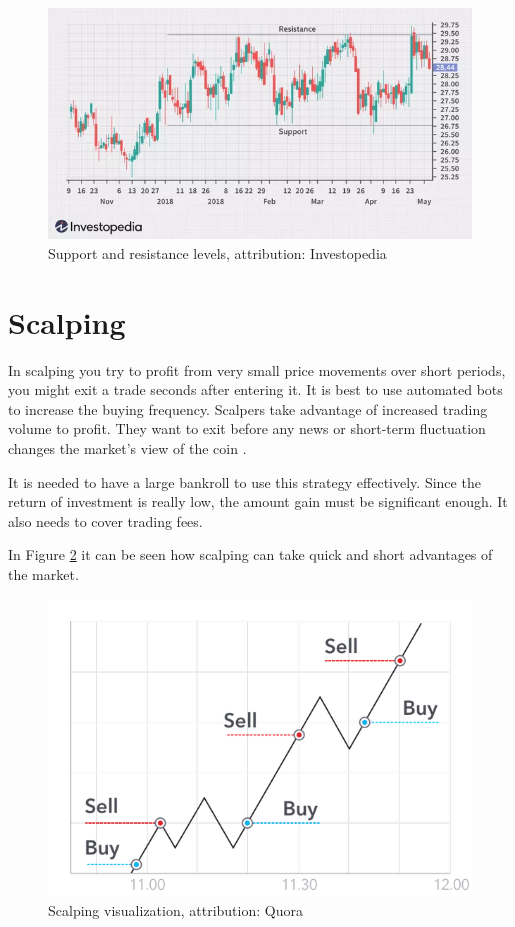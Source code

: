 \begin{figure}[ht]
    \centering
    \includegraphics[width=\columnwidth]{figures/dotdash-final-trading-range.png}
    \caption{Support and resistance levels, attribution: Investopedia \cite{investopedia:trading-range}}
    \label{sup-and-res-levels}
\end{figure}

\section{Scalping}
In scalping you try to profit from very small price movements over short periods, you might exit a trade seconds after entering it. It is best to use automated bots to increase the buying frequency. Scalpers take advantage of increased trading volume to profit. They want to exit before any news or short-term fluctuation changes the market's view of the coin \cite{best-crypto-daytrading}.

It is needed to have a large bankroll to use this strategy effectively. Since the return of investment is really low, the amount gain must be significant enough. It also needs to cover trading fees. 

In Figure \ref{scalping-figure} it can be seen how scalping can take quick and short advantages of the market.

\begin{figure}[ht]
    \label{scalping-figure}
    \centering
    \includegraphics[width=\columnwidth]{figures/scalping.png}
    \caption{Scalping visualization, attribution: Quora \cite{best-crypto-daytrading}}
\end{figure}

